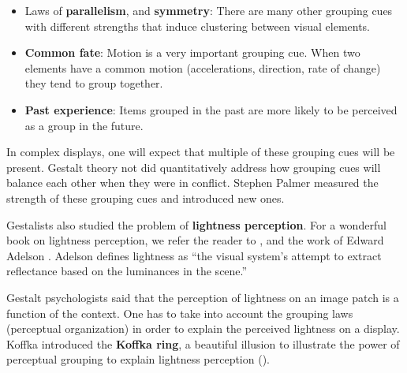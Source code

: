 \begin{itemize}
    \item Laws of {\bf parallelism}, and {\bf symmetry}: There are many other grouping cues with different strengths that induce clustering between visual elements.
    \item {\bf Common fate}: Motion is a very important grouping cue. When two elements have a common motion (accelerations, direction, rate of change) they tend to group together.
    \item {\bf Past experience}: Items grouped in the past are more likely to be perceived as a group in the future.
\end{itemize}

In complex displays, one will expect that multiple of these grouping cues will be present. Gestalt theory not did quantitatively address how grouping cues will balance each other when they were in conflict. Stephen Palmer \cite{Palmer94} measured the strength of these grouping cues and introduced new ones.

Gestalists also studied the problem of {\bf lightness perception}.
For a wonderful book on lightness perception, we refer the reader to \cite{gilchrist2006}, and the work of Edward Adelson \cite{Adelson99}. Adelson defines lightness as ``the visual system’s attempt to extract reflectance based on the luminances in the scene.''

Gestalt psychologists said that the perception of lightness on an image patch is a function of the context. One has to take into account the grouping laws (perceptual organization) in order to explain the perceived lightness on a display. Koffka \cite{Koffka1935} introduced the {\bf Koffka ring}, a beautiful illusion to illustrate the power of perceptual grouping to explain lightness perception (\fig{\ref{fig:koffka_ring}}).

